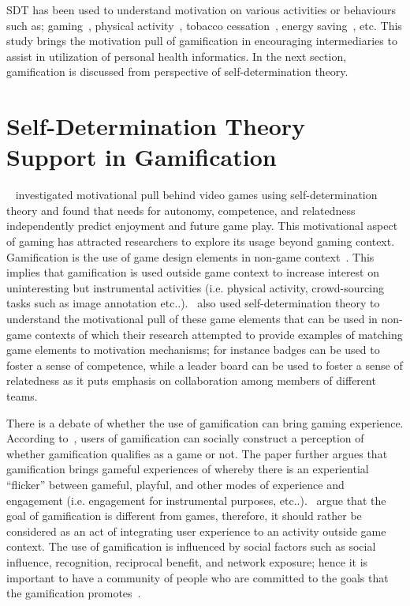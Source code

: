 SDT has been used to understand motivation on various activities or behaviours such as; gaming~\citep{ryan2006:motivationalpull}, physical activity~\citep{power2011:obesity}, tobacco cessation~\citep{williams2006:testing}, energy saving~\citep{webb2013:self}, etc. This study brings the motivation pull of gamification in encouraging intermediaries to assist in utilization of personal health informatics. In the next section, gamification is discussed from perspective of self-determination theory.
\section{Self-Determination Theory Support in Gamification}
~\cite{ryan2006:motivationalpull} investigated motivational pull behind video games using self-determination theory and found that needs for autonomy, competence, and relatedness independently predict enjoyment and future game play. This motivational aspect of gaming has attracted researchers to explore its usage beyond gaming context. Gamification is the use of game design elements in non-game context~\citep{deterding2011game}. This implies that gamification is used outside game context to increase interest on uninteresting but instrumental activities (i.e. physical activity, crowd-sourcing tasks such as image annotation etc..).~\cite{sailer2013:psychological} also used self-determination theory to understand the motivational pull of these game elements that can be used in non-game contexts of which their research attempted to provide examples of matching game elements to motivation mechanisms; for instance badges can be used to foster a sense of competence, while a leader board can be used to foster a sense of relatedness as it puts emphasis on collaboration among members of different teams.

There is a debate of whether the use of gamification can bring gaming experience. According to~\cite{deterding2011game}, users of gamification can socially construct a perception of whether gamification qualifies as a game or not. The paper further argues that gamification brings gameful experiences of whereby there is an experiential ``flicker'' between gameful, playful, and other modes of experience and engagement (i.e. engagement for instrumental purposes, etc..).~\cite{seaborn2015:gamification} argue that the goal of gamification is different from games, therefore, it should rather be considered as an act of integrating user experience to an activity outside game context. The use of gamification is influenced by social factors such as social influence, recognition, reciprocal benefit, and network exposure; hence it is important to have a community of people who are committed to the goals that the gamification promotes~\citep{hamari2013social}.

